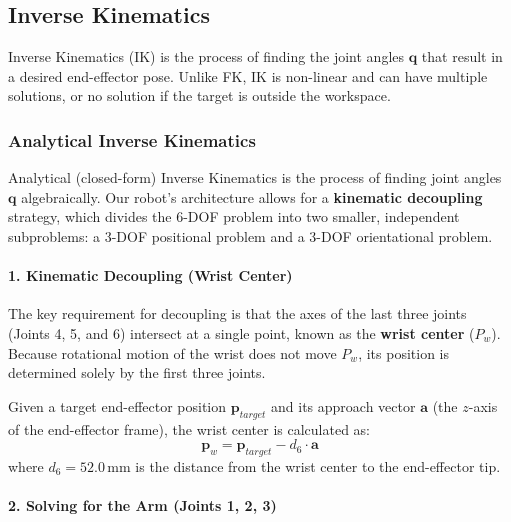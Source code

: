 \documentclass[12pt,a4paper]{report}
\begin{document}
\subsection{Inverse Kinematics}

Inverse Kinematics (IK) is the process of finding the joint angles $\mathbf{q}$ that result in a desired end-effector pose. Unlike FK, IK is non-linear and can have multiple solutions, or no solution if the target is outside the workspace.

\subsubsection{Analytical Inverse Kinematics}

Analytical (closed-form) Inverse Kinematics is the process of finding joint angles $\mathbf{q}$ algebraically. Our robot's architecture allows for a \textbf{kinematic decoupling} strategy, which divides the 6-DOF problem into two smaller, independent subproblems: a 3-DOF positional problem and a 3-DOF orientational problem.

\paragraph{1. Kinematic Decoupling (Wrist Center)}

The key requirement for decoupling is that the axes of the last three joints (Joints 4, 5, and 6) intersect at a single point, known as the \textbf{wrist center} ($P_w$). Because rotational motion of the wrist does not move $P_w$, its position is determined solely by the first three joints.

Given a target end-effector position $\mathbf{p}_{target}$ and its approach vector $\mathbf{a}$ (the $z$-axis of the end-effector frame), the wrist center is calculated as:
\begin{equation}
    \mathbf{p}_w = \mathbf{p}_{target} - d_6 \cdot \mathbf{a}
\end{equation}
where $d_6 = 52.0\,$mm is the distance from the wrist center to the end-effector tip.

\paragraph{2. Solving for the Arm (Joints 1, 2, 3)}
\end{document}

